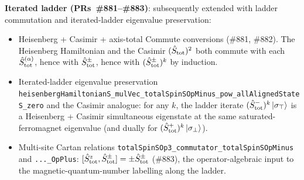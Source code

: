 \documentclass[a4paper,11pt]{article}
\begin{document}
\textbf{Iterated ladder (PRs~\#881--\#883)}: subsequently extended
with ladder commutation and iterated-ladder eigenvalue preservation:
\begin{itemize}
\item Heisenberg + Casimir + axis-total Commute conversions (\#881,
  \#882). The Heisenberg Hamiltonian and the Casimir
  $(\hat S_{\rm tot})^2$ both commute with each
  $\hat S^{(\alpha)}_{\rm tot}$, hence with $\hat S^\pm_{\rm tot}$,
  hence with $(\hat S^\pm_{\rm tot})^k$ by induction.
\item Iterated-ladder eigenvalue preservation
  \texttt{heisenbergHamiltonianS\_mulVec\_totalSpinSOpMinus\_pow\_allAlignedStateS\_zero}
  and the Casimir analogue: for any $k$, the ladder iterate
  $(\hat S^-_{\rm tot})^k\,|\sigma_\top\rangle$ is a
  Heisenberg + Casimir simultaneous eigenstate at the same
  saturated-ferromagnet eigenvalue (and dually for
  $(\hat S^+_{\rm tot})^k\,|\sigma_\bot\rangle$).
\item Multi-site Cartan relations
  \texttt{totalSpinSOp3\_commutator\_totalSpinSOpMinus} and
  \texttt{...\_OpPlus}: $[\hat S^z_{\rm tot}, \hat S^\pm_{\rm tot}] =
  \pm \hat S^\pm_{\rm tot}$ (\#883), the operator-algebraic input to
  the magnetic-quantum-number labelling along the ladder.
\end{itemize}
\end{document}
